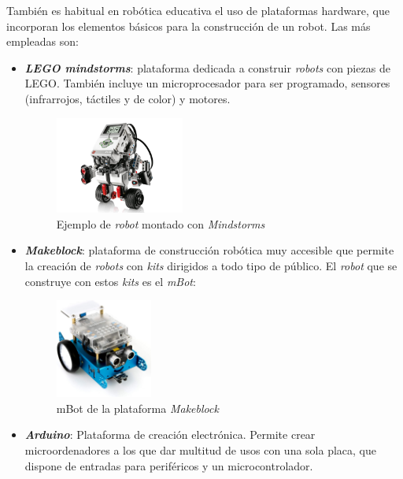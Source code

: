 También es habitual en robótica educativa el uso de plataformas hardware, que incorporan los elementos básicos para la construcción de un robot. Las más empleadas son: 
\begin{itemize}
    \item \textit{\textbf{LEGO mindstorms}}: plataforma dedicada a construir \textit{robots} con piezas de LEGO. También incluye un microprocesador para ser programado, sensores (infrarrojos, táctiles y de color) y motores.
            \begin{figure}[H]
        \centering
        \includegraphics[width=0.4\textwidth]{img/legomind.jpg}
        \caption{Ejemplo de \textit{robot} montado con \textit{Mindstorms}} \label{fig:lego}
    \end{figure}
    \item \textit{\textbf{Makeblock}}\cite{bib:makeblock}: plataforma de construcción robótica muy accesible que permite la creación de \textit{robots} con \textit{kits} dirigidos a todo tipo de público. El \textit{robot} que se construye con estos \textit{kits} es el \textit{mBot}:
        \begin{figure}[H]
        \centering
        \includegraphics[width=0.3\textwidth]{img/mBotReal.jpg}
        \caption{mBot de la plataforma \textit{Makeblock}} \label{fig:makeblock}
    \end{figure}
    
    \item \textit{\textbf{Arduino}}\cite{bib:arduino}: Plataforma de creación electrónica. Permite crear microordenadores a los que dar multitud de usos con una sola placa, que dispone de entradas para periféricos y un microcontrolador.
    
\end{itemize}{}